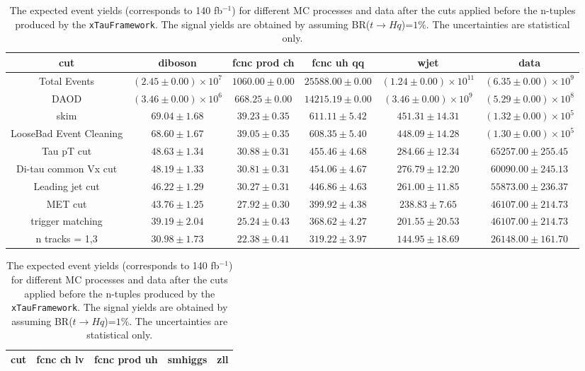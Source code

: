 \begin{table}
\footnotesize
\caption{ The expected event yields (corresponds to 140 fb$^{-1}$) for different MC processes and data after the cuts applied before the n-tuples produced by the {\tt xTauFramework}. The signal yields are obtained by assuming BR($t\to Hq$)=$1\%$. The uncertainties are statistical only.}
\centering
\begin{tabular}{|c|c|c|c|c|c|} \hline

cut & diboson & fcnc prod ch & fcnc uh qq & wjet & data\\ \hline
Total Events & $( 2.45 \pm 0.00 ) \times 10^{7}$ & $1060.00 \pm 0.00$ & $25588.00 \pm 0.00$ & $( 1.24 \pm 0.00 ) \times 10^{11}$ & $( 6.35 \pm 0.00 ) \times 10^{9}$\\ \hline
DAOD & $( 3.46 \pm 0.00 ) \times 10^{6}$ & $668.25 \pm 0.00$ & $14215.19 \pm 0.00$ & $( 3.46 \pm 0.00 ) \times 10^{9}$ & $( 5.29 \pm 0.00 ) \times 10^{8}$\\ \hline
skim & $69.04 \pm 1.68$ & $39.23 \pm 0.35$ & $611.11 \pm 5.42$ & $451.31 \pm 14.31$ & $( 1.32 \pm 0.00 ) \times 10^{5}$\\ \hline
LooseBad Event Cleaning & $68.60 \pm 1.67$ & $39.05 \pm 0.35$ & $608.35 \pm 5.40$ & $448.09 \pm 14.28$ & $( 1.30 \pm 0.00 ) \times 10^{5}$\\ \hline
Tau pT cut & $48.63 \pm 1.34$ & $30.88 \pm 0.31$ & $455.46 \pm 4.68$ & $284.66 \pm 12.34$ & $65257.00 \pm 255.45$\\ \hline
Di-tau common Vx cut & $48.19 \pm 1.33$ & $30.81 \pm 0.31$ & $454.06 \pm 4.67$ & $276.79 \pm 12.20$ & $60090.00 \pm 245.13$\\ \hline
Leading jet cut & $46.22 \pm 1.29$ & $30.27 \pm 0.31$ & $446.86 \pm 4.63$ & $261.00 \pm 11.85$ & $55873.00 \pm 236.37$\\ \hline
MET cut & $43.76 \pm 1.25$ & $27.92 \pm 0.30$ & $399.92 \pm 4.38$ & $238.83 \pm 7.65$ & $46107.00 \pm 214.73$\\ \hline
trigger matching & $39.19 \pm 2.04$ & $25.24 \pm 0.43$ & $368.62 \pm 4.27$ & $201.55 \pm 20.53$ & $46107.00 \pm 214.73$\\ \hline
n tracks = 1,3 & $30.98 \pm 1.73$ & $22.38 \pm 0.41$ & $319.22 \pm 3.97$ & $144.95 \pm 18.69$ & $26148.00 \pm 161.70$\\ \hline
\end{tabular}
\label{tab:yields_hh_1}
\begin{tabular}{|c|c|c|c|c|} \hline
cut & fcnc ch lv & fcnc prod uh & smhiggs & zll\\ \hline

\end{tabular}
\end{table}
